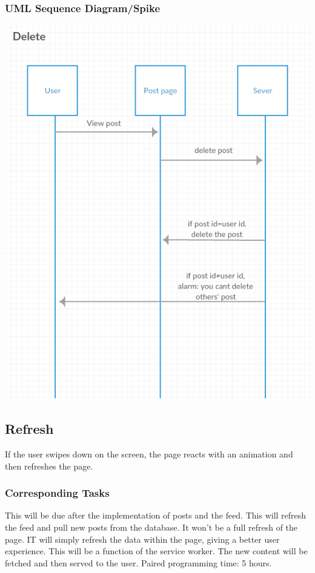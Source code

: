 \documentclass[12pt]{article}
\begin{document}
\subsubsection{UML Sequence Diagram/Spike}
\includegraphics[scale=0.5]{img/5.png}\linebreak

\subsection{Refresh}
If the user swipes down on the screen, the page reacts with an animation and
then refreshes the page.
\subsubsection{Corresponding Tasks}
	This will be due after the implementation of posts and the feed.  This will refresh the feed and pull new posts from the database.  It won’t be a full refresh of the page.  IT will simply refresh the data within the page, giving a better user experience.  This will be a function of the service worker.  The new content will be fetched and then served to the user.  Paired programming time: 5 hours.
\end{document}
